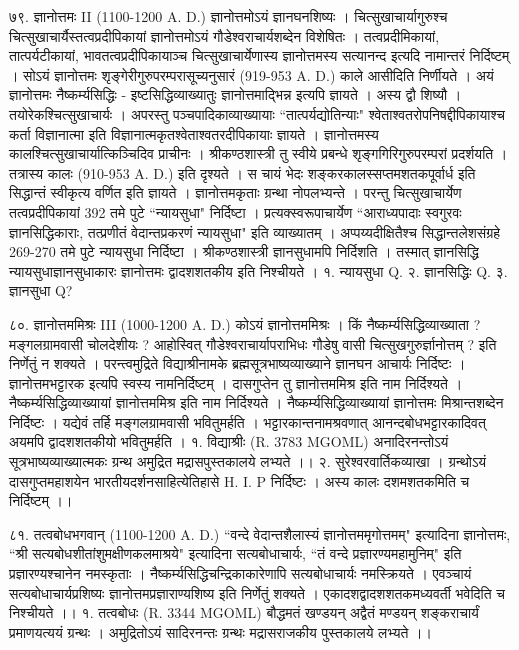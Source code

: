 ७९. ज्ञानोत्तमः II (1100-1200 A. D.)
ज्ञानोत्तमोऽयं ज्ञानघनशिष्यः । चित्सुखाचार्यागुरुश्च चित्सुखाचार्यैस्तत्वप्रदीपिकायां ज्ञानोत्तमोऽयं गौडेश्वराचार्यशब्देन विशेषितः । तत्वप्रदीमिकायां, तात्पर्यटीकायां, भावतत्वप्रदीपिकायाञ्च चित्सुखाचार्येणास्य ज्ञानोत्तमस्य सत्यानन्द इत्यदि नामान्तरं निर्दिष्टम् । सोऽयं ज्ञानोत्तमः शृङ्गेरीगुरुपरम्परासूच्यनुसारं (919-953 A. D.) काले आसीदिति निर्णीयते ।
अयं ज्ञानोत्तमः नैष्कर्म्यसिद्धिः - इष्टसिद्धिव्याख्यातुः ज्ञानोत्तमाद्भिन्न इत्यपि ज्ञायते । अस्य द्वौ शिष्यौ । तयोरेकश्चित्सुखाचार्यः । अपरस्तु पञ्चपादिकाव्याख्यायाः ``तात्पर्यद्योतिन्याः" श्वेताश्वतरोपनिषद्दीपिकायाश्च कर्ता विज्ञानात्मा इति विज्ञानात्मकृतश्वेताश्वतरदीपिकायाः ज्ञायते ।
ज्ञानोत्तमस्य कालश्चित्सुखाचार्यात्किञ्चिदिव प्राचीनः । श्रीकण्ठशास्त्री तु स्वीये प्रबन्धे शृङ्गगिरिगुरुपरम्परां प्रदर्शयति । तत्रास्य कालः (910-953 A. D.) इति दृश्यते । स चायं भेदः शङ्करकालस्सप्तमशतकपूर्वार्ध इति सिद्धान्तं स्वीकृत्य वर्णित इति ज्ञायते ।
ज्ञानोत्तमकृताः ग्रन्था नोपलभ्यन्ते । परन्तु चित्सुखाचार्येण तत्वप्रदीपिकायां 392 तमे पुटे ``न्यायसुधा" निर्दिष्टा । प्रत्यक्स्वरूपाचार्येण ``आराध्यपादाः स्वगुरवः ज्ञानसिद्धिकाराः, तत्प्रणीतं वेदान्तप्रकरणं न्यायसुधा" इति व्याख्यातम् । अप्पय्यदीक्षितैश्च सिद्धान्तलेशसंग्रहे 269-270 तमे पुटे न्यायसुधा निर्दिष्टा । श्रीकण्ठशास्त्री ज्ञानसुधामपि निर्दिशति । तस्मात् ज्ञानसिद्धि न्यायसुधाज्ञानसुधाकारः ज्ञानोत्तमः द्वादशशतकीय इति निश्चीयते ।
१. न्यायसुधा Q.
२. ज्ञानसिद्धिः Q.
३. ज्ञानसुधा Q?

८०. ज्ञानोत्तममिश्रः III (1000-1200 A. D.)
कोऽयं ज्ञानोत्तममिश्रः । किं नैष्कर्म्यसिद्धिव्याख्याता ? मङ्गलग्रामवासी चोलदेशीयः ? आहोस्वित् गौडेश्वराचार्यापराभिधः गौडेषु वासी चित्सुखगुरुर्ज्ञानोत्तम् ? इति निर्णेतुं न शक्यते । परन्त्वमुद्रिते विद्याश्रीनामके ब्रह्मसूत्रभाष्यव्याख्याने ज्ञानघन आचार्यः निर्दिष्टः । ज्ञानोत्तमभट्टारक इत्यपि स्वस्य नामनिर्दिष्टम् । दासगुप्तेन तु ज्ञानोत्तममिश्र इति नाम निर्दिश्यते । नैष्कर्म्यसिद्धिव्याख्यायां ज्ञानोत्तममिश्र इति नाम निर्दिश्यते । नैष्कर्म्यसिद्धिव्याख्यायां ज्ञानोत्तमः मिश्रान्तशब्देन निर्दिष्टः । यद्येवं तर्हि मङ्गलग्रामवासी भवितुमर्हति । भट्टारकान्तनामश्रवणात् आनन्दबोधभट्टारकादिवत् अयमपि द्वादशशतकीयो भवितुमर्हति । 
१. विद्याश्रीः (R. 3783 MGOML)
अनादिरनन्तोऽयं सूत्रभाष्यव्याख्यात्मकः ग्रन्थ अमुद्रित मद्रासपुस्तकालये लभ्यते ।।
२. सुरेश्वरवार्तिकव्याखा । ग्रन्थोऽयं दासगुप्तमहाशयेन भारतीयदर्शनसाहित्येतिहासे H. I. P निर्दिष्टः । अस्य कालः दशमशतकमिति च निर्दिष्टम् ।।

८१. तत्वबोधभगवान् (1100-1200 A. D.)
``वन्दे वेदान्तशैलास्यं ज्ञानोत्तममृगोत्तमम्" इत्यादिना ज्ञानोत्तमः, ``श्री सत्यबोधशीतांशुमक्षीणकलमाश्रये" इत्यादिना सत्यबोधाचार्यः, ``तं वन्दे प्रज्ञारण्यमहामुनिम्" इति प्रज्ञारण्यश्चानेन नमस्कृताः । नैष्कर्म्यसिद्धिचन्द्रिकाकारेणापि सत्यबोधाचार्यः नमस्क्रियते । एवञ्चायं सत्यबोधाचार्यप्रशिष्यः ज्ञानोत्तमप्रज्ञाराण्यशिष्य इति निर्णेतुं शक्यते । एकादशद्वादशशतकमध्यवर्ती भवेदिति च निश्चीयते ।।
१. तत्वबोधः (R. 3344 MGOML) बौद्धमतं खण्डयन् अद्वैतं मण्डयन् शङ्कराचार्यं प्रमाणयत्ययं ग्रन्थः । अमुद्रितोऽयं सादिरनन्तः ग्रन्थः मद्रासराजकीय पुस्तकालये लभ्यते ।।

